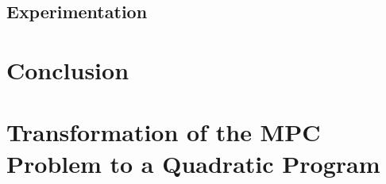 \documentclass{thesisreport}
\begin{document}
\newpage 
 
 	\section{Experimentation}

\newpage 
 
 \chapter*{Conclusion}
 
 
 \appendix	
 
 \chapter{Transformation of the MPC Problem to a Quadratic Program}\label{appendix_MPC}
 \label{sec:proof_MPC_to_QP}
\end{document}
